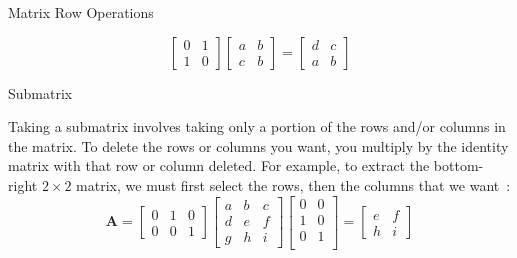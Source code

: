 \documentclass[aspectratio=169,xcolor=dvipsnames]{beamer}
\begin{document}
\begin{frame}{Matrix Row Operations}
\begin{enumerate}
{$$\begin{bmatrix}
                  0 & 1 \\
                  1 & 0
                \end{bmatrix} 
            \begin{bmatrix}
              a & b \\
              c & b
            \end{bmatrix}
            = 
            \begin{bmatrix}
                  d & c \\
                  a & b
                \end{bmatrix} 
            $$
            }
\end{enumerate}

\end{frame}

\begin{frame}{Submatrix}

Taking a submatrix involves taking only a portion of the rows and/or columns in
the matrix. To delete the rows or columns you want, you multiply by the identity
matrix with that row or column deleted.
For example, to extract the bottom-right $2 \times 2$ matrix, we must
first select the rows, then the columns that we want{\color{red}~\cite{mathse1322946}}:
$$\mathbf{A} = 
\begin{bmatrix}
      0 & 1 & 0 \\
      0 & 0 & 1
\end{bmatrix} 
\begin{bmatrix}
  a & b & c \\
  d & e & f \\
  g & h & i
\end{bmatrix}
\begin{bmatrix}
      0 & 0 \\
      1 & 0 \\
      0 & 1 \\
\end{bmatrix} 
= 
\begin{bmatrix}
      e & f \\
      h & i
    \end{bmatrix} 
$$

\end{frame}


\end{document}
